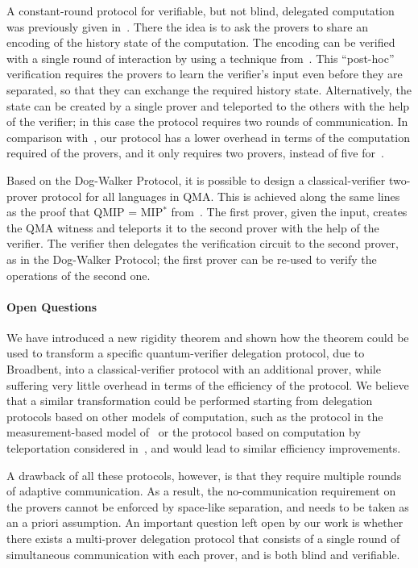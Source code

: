 \documentclass[11pt,letter]{article}
\theoremstyle{remark}
\theoremstyle{definition}
\begin{document}
A constant-round protocol for verifiable, but not blind, delegated computation was previously given in~\cite{hajdusek2015posthoc}. There the idea is to ask the provers to share an encoding of the history state of the computation. The encoding can  be verified with a single round of interaction by using a technique from~\cite{Ji16}. This ``post-hoc'' verification requires the provers to learn the verifier's input even before they are separated, so that they can exchange the required history state. Alternatively, the state can be created by a single prover and teleported to the others with the help of the verifier; in this case the protocol requires two rounds of communication. In comparison with~\cite{hajdusek2015posthoc}, our protocol has a lower overhead in terms of the computation required of the provers, and it only requires two provers, instead of five for~\cite{hajdusek2015posthoc}.

Based on the Dog-Walker Protocol, it is possible to design a classical-verifier  two-prover protocol for all languages in QMA. This is achieved along the same lines as the proof that QMIP = MIP$^*$ from~\cite{reichardt2012classical}. The first prover, given the input, creates the QMA witness and teleports it to the second prover with the help of the verifier. The verifier then delegates the verification circuit to the second prover, as in the Dog-Walker Protocol; the first prover can be re-used to verify the operations of the second one.



\paragraph{Open Questions}
We have introduced a new rigidity theorem and shown how the theorem could be used to transform a specific quantum-verifier delegation protocol, due to Broadbent, into a classical-verifier protocol with an additional prover, while suffering very little overhead in terms of the efficiency of the protocol. We believe that a similar transformation could be performed starting from delegation protocols based on other models of computation, such as the protocol in the measurement-based model of~\cite{fitzsimons12vubqc} or the protocol based on computation by teleportation considered in~\cite{reichardt2012classical}, and would lead to similar efficiency improvements. 

A drawback of all these protocols, however, is that they require multiple rounds of adaptive communication. As a result, the no-communication requirement on the provers cannot be enforced by space-like separation, and needs to be taken as an a priori assumption. An important question left open by our work is whether there exists a multi-prover delegation protocol that consists of a single round of simultaneous communication with each prover, and is both blind and verifiable.
\end{document}
